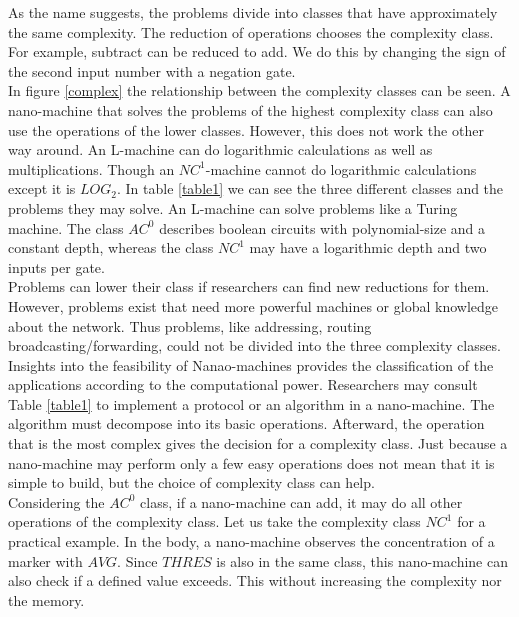 \documentclass[10pt,sigconf]{acmart}
\begin{document}
As the name suggests, the problems divide into classes that have approximately the same complexity.
The reduction of operations chooses the complexity class. For example, subtract can be reduced to add. 
We do this by changing the sign of the second input number with a negation gate. \\
In figure \ref{complex} the relationship between the complexity classes can be seen.
A nano-machine that solves the problems of the highest complexity class can also use the operations of the lower classes.
However, this does not work the other way around.
An L-machine can do logarithmic calculations as well as multiplications.
Though an $NC^1$-machine cannot do logarithmic calculations except it is $LOG_2$.  
In table \ref{table1} we can see the three different classes and the problems they may solve.
An L-machine can solve problems like a Turing machine.
The class $AC^0$ describes boolean circuits with polynomial-size and a constant depth, whereas the class $NC^1$ may have a logarithmic depth and two inputs per gate.\\ 
Problems can lower their class if researchers can find new reductions for them. 
However, problems exist that need more powerful machines or global knowledge about the network.
Thus problems, like addressing, routing broadcasting/forwarding, could not be divided into the three complexity classes.\\
Insights into the feasibility of Nanao-machines provides the classification of the applications according to the computational power. 
Researchers may consult Table \ref{table1} to implement a protocol or an algorithm in a nano-machine. 
The algorithm must decompose into its basic operations. Afterward, the operation that is the most complex gives the decision for a complexity class.
Just because a nano-machine may perform only a few easy operations does not mean that it is simple to build, but the choice of complexity class can help.\\
Considering the $AC^0$ class, if a nano-machine can add, it may do all other operations of the complexity class.
Let us take the complexity class $NC^1$ for a practical example. In the body, a nano-machine observes the concentration of a marker with $AVG$.
Since $THRES$ is also in the same class, this nano-machine can also check if a defined value exceeds. This without increasing the complexity nor the memory.
\end{document}
